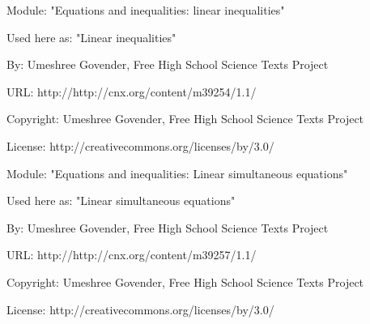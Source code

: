       \par\vspace{9pt}\noindent\begin{minipage}{\textwidth}
      Module: "Equations and inequalities: linear inequalities" \par\nopagebreak\noindent
      Used here as: "Linear inequalities" \par\nopagebreak\noindent
        By: Umeshree Govender, Free High School Science Texts Project\par\nopagebreak\noindent
      URL: http://http://cnx.org/content/m39254/1.1/\par\nopagebreak\noindent
      \par\nopagebreak\noindent
      Copyright: Umeshree Govender, Free High School Science Texts Project\par\nopagebreak\noindent
      License:  http://creativecommons.org/licenses/by/3.0/\par\nopagebreak\noindent
      \par\end{minipage}
      \par\vspace{9pt}\noindent\begin{minipage}{\textwidth}
      Module: "Equations and inequalities: Linear simultaneous equations" \par\nopagebreak\noindent
      Used here as: "Linear simultaneous equations" \par\nopagebreak\noindent
        By: Umeshree Govender, Free High School Science Texts Project\par\nopagebreak\noindent
      URL: http://http://cnx.org/content/m39257/1.1/\par\nopagebreak\noindent
      \par\nopagebreak\noindent
      Copyright: Umeshree Govender, Free High School Science Texts Project\par\nopagebreak\noindent
      License:  http://creativecommons.org/licenses/by/3.0/\par\nopagebreak\noindent
      \par\end{minipage}
